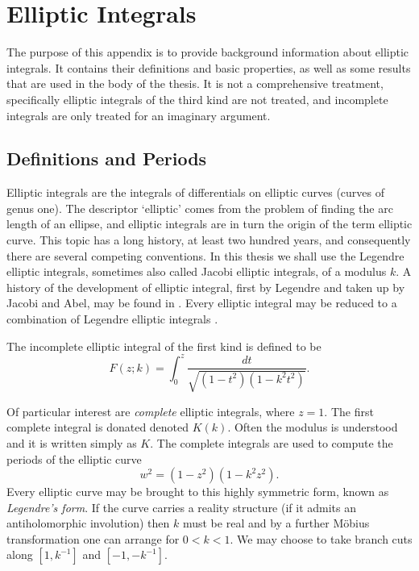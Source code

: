 
\chapter{Elliptic Integrals}
\label{chp:Elliptic Integrals}

\stoptocentries

The purpose of this appendix is to provide background information about elliptic integrals. It contains their definitions and basic properties, as well as some results that are used in the body of the thesis. It is not a comprehensive treatment, specifically elliptic integrals of the third kind are not treated, and incomplete integrals are only treated for an imaginary argument.

\section{Definitions and Periods}
\label{sec:Elliptic Defs}
Elliptic integrals are the integrals of differentials on elliptic curves (curves of genus one). The descriptor `elliptic' comes from the problem of finding the arc length of an ellipse, and elliptic integrals are in turn the origin of the term elliptic curve. This topic has a long history, at least two hundred years, and consequently there are several competing conventions. In this thesis we shall use the Legendre elliptic integrals, sometimes also called Jacobi elliptic integrals, of a modulus $k$. A history of the development of elliptic integral, first by Legendre and taken up by Jacobi and Abel, may be found in \cite{Bottazzini2013}. Every elliptic integral may be reduced to a combination of Legendre elliptic integrals \cite{armitage2006elliptic,Hancock1910}.

\begin{defn}
The incomplete elliptic integral of the first kind is defined to be
\[
F(z;k) = \int_0^z \frac{dt}{\sqrt{(1-t^2)(1-k^2 t^2)}}.
\]
\end{defn}

Of particular interest are \emph{complete} elliptic integrals, where $z=1$. The first complete integral is donated denoted $K(k)$. Often the modulus is understood and it is written simply as $K$. The complete integrals are used to compute the periods of the elliptic curve
\[
w^2 = (1-z^2)(1-k^2 z^2).
\]
Every elliptic curve may be brought to this highly symmetric form, known as \emph{Legendre's form}. If the curve carries a reality structure (if it admits an antiholomorphic involution) then $k$ must be real and by a further Möbius transformation one can arrange for $0 < k < 1$. We may choose to take branch cuts along $[1,k^{-1}]$ and $[-1,-k^{-1}]$.

